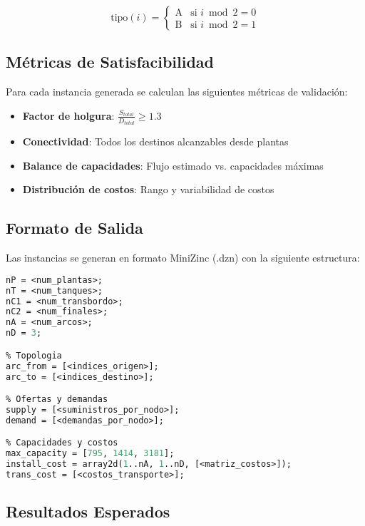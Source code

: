 \documentclass[12pt]{article}
\begin{document}
\begin{equation}
\text{tipo}(i) = \begin{cases}
\text{A} & \text{si } i \bmod 2 = 0 \\
\text{B} & \text{si } i \bmod 2 = 1
\end{cases}
\end{equation}

\subsection{Métricas de Satisfacibilidad}

Para cada instancia generada se calculan las siguientes métricas de validación:

\begin{itemize}[leftmargin=*]
    \item \textbf{Factor de holgura}: $\frac{S_{total}}{D_{total}} \geq 1.3$
    \item \textbf{Conectividad}: Todos los destinos alcanzables desde plantas
    \item \textbf{Balance de capacidades}: Flujo estimado vs. capacidades máximas
    \item \textbf{Distribución de costos}: Rango y variabilidad de costos
\end{itemize}

\subsection{Formato de Salida}

Las instancias se generan en formato MiniZinc (.dzn) con la siguiente estructura:

\begin{lstlisting}[language=Pascal, basicstyle=\small\ttfamily, frame=single]
% Parametros de tamano
nP = <num_plantas>;
nT = <num_tanques>;  
nC1 = <num_transbordo>;
nC2 = <num_finales>;
nA = <num_arcos>;
nD = 3;

% Topologia
arc_from = [<indices_origen>];
arc_to = [<indices_destino>];

% Ofertas y demandas  
supply = [<suministros_por_nodo>];
demand = [<demandas_por_nodo>];

% Capacidades y costos
max_capacity = [795, 1414, 3181];
install_cost = array2d(1..nA, 1..nD, [<matriz_costos>]);
trans_cost = [<costos_transporte>];
\end{lstlisting}

\subsection{Resultados Esperados}
\end{document}
